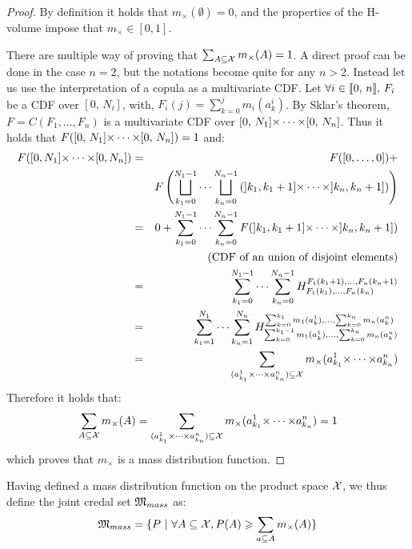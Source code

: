 \begin{proof}
    By definition it holds that $m_\times(\emptyset)=0$, and the properties of the H-volume impose that $m_\times\in[0,1]$.
    
    There are multiple way of proving that $\sum_{A\subseteq{\mathcal{X}}}m_\times(A)=1$. A direct proof can be done in the case $n=2$, but the notations become quite for any $n>2$. Instead let us use the interpretation of a copula as a multivariate CDF. 
    Let $\forall i\in{[\![} 0,\, n{]\!]},\, F_i$ be a CDF over $[0,\, N_i]$, with, $F_i(j)=\sum_{k=0}^j m_i(a_k^i)$. By Sklar's theorem, $F=C(F_1,\dots, F_n)$ is a multivariate CDF over $[0,\, N_1]{\times\dots\times}[0,\, N_n]$. Thus it holds that $F([0,\, N_1]{\times\dots\times}[0,\, N_n])=1$ and:
    \begin{eqnarray*}
        F([0, N_1]{\times\dots\times}[0, N_n]) &=& F([0,\dots,0])+\\
        &&F\left(\bigsqcup_{k_1=0}^{N_1-1}\dots\bigsqcup_{k_n=0}^{N_n-1}\left(]k_1, k_1+1]{\times\dots\times}]k_n, k_n+1]\right)\right)\\
        &=& 0 + \sum_{k_1=0}^{N_1-1}\dots\sum_{k_n=0}^{N_n-1} F(]k_1, k_1+1]{\times\dots\times}]k_n, k_n+1])\\
        && \text{(CDF of an union of disjoint elements)}\\
        &=& \sum_{k_1=0}^{N_1-1}\dots\sum_{k_n=0}^{N_n-1} H_{F_1(k_1), \dots, F_n(k_n)}^{F_1(k_1+1), \dots, F_n(k_n+1)}\\
        &=& \sum_{k_1=1}^{N_1}\dots\sum_{k_n=1}^{N_n} H_{\sum_{k=0}^{k_1-1}m_1(a^1_k), \dots, \sum_{k=0}^{k_n}m_n(a^n_k)}^{\sum_{k=0}^{k_1}m_1(a^1_k), \dots, \sum_{k=0}^{k_n}m_n(a^n_k)}\\
        &=& \sum_{(a^1_{k_1}{\times\dots\times} a^n_{k_n})\subseteq{\mathcal{X}}}m_\times(a^1_{k_1}{\times\dots\times} a^n_{k_n})
    \end{eqnarray*}
Therefore it holds that:
\begin{eqnarray}
    \sum_{A\subseteq{\mathcal{X}}}m_\times(A)=\sum_{(a^1_{k_1}{\times\dots\times} a^n_{k_n})\subseteq{\mathcal{X}}}m_\times(a^1_{k_1}{\times\dots\times} a^n_{k_n})=1
\end{eqnarray}
which proves that $m_\times$ is a mass distribution function.
\end{proof}

Having defined a mass distribution function on the product space ${\mathcal{X}}$, we thus define the joint credal set ${\mathfrak{M}}_{mass}$ as: 
\begin{eqnarray}\label{eq:credal_set_mass}
    {\mathfrak{M}}_{mass} = \{P~|~\forall A\subseteq{\mathcal{X}}, P(A)\geqslant \sum_{a\subseteq A}m_\times(A)\}
\end{eqnarray}

